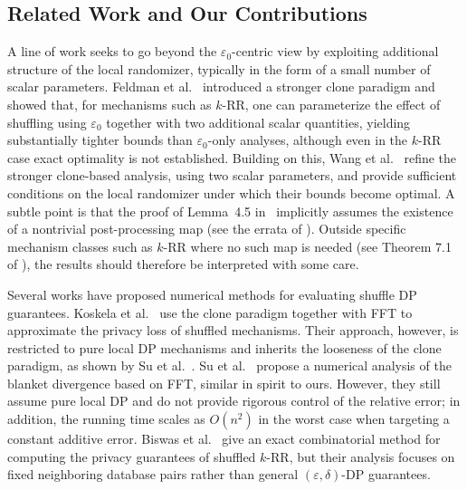 \documentclass{article}
\theoremstyle{plain}
\theoremstyle{definition}
\begin{document}
\subsection*{Related Work and Our Contributions}
\label{sec:related-work}

A line of work seeks to go beyond the $\varepsilon_0$-centric view by exploiting additional structure of the local randomizer, typically in the form of a small number of scalar parameters.
Feldman et al.~\cite{feldmanStrongerPrivacyAmplification2023a} introduced a stronger clone paradigm and showed that, for mechanisms such as $k$-RR, one can parameterize the effect of shuffling using $\varepsilon_0$ together with two additional scalar quantities, yielding substantially tighter bounds than $\varepsilon_0$-only analyses, although even in the $k$-RR case exact optimality is not established.
Building on this, Wang et al.~\cite{wangPrivacyAmplificationShuffling2024b, wangShuffleModelDifferential2025a} refine the stronger clone-based analysis, using two scalar parameters, and provide sufficient conditions on the local randomizer under which their bounds become optimal. 
A subtle point is that the proof of Lemma~4.5 in~\cite{wangPrivacyAmplificationShuffling2024b} implicitly assumes the existence of a nontrivial post-processing map (see the errata of \cite{feldmanStrongerPrivacyAmplification2023a}).
Outside specific mechanism classes such as $k$-RR where no such map is needed (see Theorem 7.1 of \cite{feldmanStrongerPrivacyAmplification2023a}), the results should therefore be interpreted with some care.




Several works have proposed numerical methods for evaluating shuffle DP guarantees.
Koskela et al.~\cite{koskelaNumericalAccountingShuffle2022} use the clone paradigm together with FFT to approximate the privacy loss of shuffled mechanisms.
Their approach, however, is restricted to pure local DP mechanisms and inherits the looseness of the clone paradigm, as shown by Su et al.~\cite{suDecompositionBasedOptimalBounds2025}.
Su et al.~\cite{suDecompositionBasedOptimalBounds2025} propose a numerical analysis of the blanket divergence based on FFT, similar in spirit to ours.
However, they still assume pure local DP and do not provide rigorous control of the relative error; in addition, the running time scales as $O(n^2)$ in the worst case when targeting a constant additive error.
Biswas et al.~\cite{biswasTightDifferentialPrivacy2024} give an exact combinatorial method for computing the privacy guarantees of shuffled $k$-RR, but their analysis focuses on fixed neighboring database pairs rather than general $(\varepsilon,\delta)$-DP guarantees.
\end{document}
